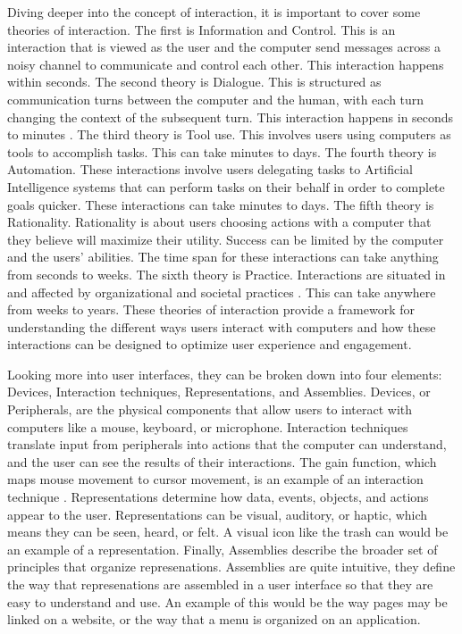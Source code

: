 \documentclass[12pt]{article}
\begin{document}
Diving deeper into the concept of interaction, it is important to cover some theories of interaction. The first is Information and Control. This is an interaction that is viewed as the user and the computer send messages across a noisy channel to communicate and control each other. This interaction happens within seconds. The second theory is Dialogue. This is structured as communication turns between the computer and the human, with each turn changing the context of the subsequent turn. This interaction happens in seconds to minutes \cite{Hornbæk_Kristensson_Oulasvirta_2025}. The third theory is Tool use. This involves users using computers as tools to accomplish tasks. This can take minutes to days. The fourth theory is Automation. These interactions involve users delegating tasks to Artificial Intelligence systems that can perform tasks on their behalf in order to complete goals quicker. These interactions can take minutes to days. The fifth theory is Rationality. Rationality is about users choosing actions with a computer that they believe will maximize their utility. Success can be limited by the computer and the users' abilities. The time span for these interactions can take anything from seconds to weeks. The sixth theory is Practice. Interactions are situated in and affected by organizational and societal practices \cite{Hornbæk_Kristensson_Oulasvirta_2025}. This can take anywhere from weeks to years. These theories of interaction provide a framework for understanding the different ways users interact with computers and how these interactions can be designed to optimize user experience and engagement. 

Looking more into user interfaces, they can be broken down into four elements: Devices, Interaction techniques, Representations, and Assemblies. Devices, or Peripherals, are the physical components that allow users to interact with computers like a mouse, keyboard, or microphone. Interaction techniques translate input from peripherals into actions that the computer can understand, and the user can see the results of their interactions. The gain function, which maps mouse movement to cursor movement, is an example of an interaction technique \cite{Hornbæk_Kristensson_Oulasvirta_2025}. Representations determine how data, events, objects, and actions appear to the user. Representations can be visual, auditory, or haptic, which means they can be seen, heard, or felt. A visual icon like the trash can would be an example of a representation. Finally, Assemblies describe the broader set of principles that organize represenations. Assemblies are quite intuitive, they define the way that represenations are assembled in a user interface so that they are easy to understand and use. An example of this would be the way pages may be linked on a website, or the way that a menu is organized on an application.
\end{document}
